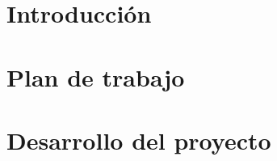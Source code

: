 \documentclass[spanish,a4paper,14pt,oneside]{extreport}
\begin{document}
\renewcommand{\thepage}{\roman{page}}
\setcounter{page}{1}


\tableofcontents

\newpage{\pagestyle{empty}}

\listoffigures

\newpage{\pagestyle{empty}}

\listoftables

\newpage{\pagestyle{empty}}

\renewcommand{\thepage}{\arabic{page}}
\setcounter{page}{1}


\chapter{Introducción}
\label{chapter:intro}




\chapter{Plan de trabajo}
\label{chapter:dos}



\newpage



\newpage{\pagestyle{empty}}
\thispagestyle{empty}

\chapter{Desarrollo del proyecto}
\label{chapter:tres}



\end{document}
